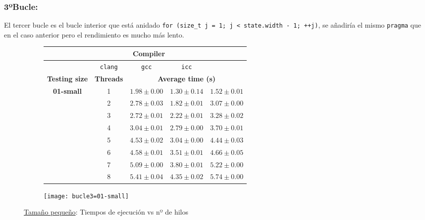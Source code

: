 
\subsubsection{\textbf{3ºBucle:}}

\par El tercer bucle es el bucle interior que está anidado \texttt{for (size\_t j = 1; j < state.width - 1; ++j)},
 se añadiría el mismo \texttt{pragma} que en el caso anterior pero el rendimiento es mucho más lento.

\begin{figure}[H]
    \centering
    \begin{subfigure}{0.4\textwidth}
        \begin{adjustbox}{width=\textwidth} 
        \begin{tabular}{|c|c|c|c|c|}
            \hline
            \rowcolor{azul} \multicolumn{2}{|c|}{}&\multicolumn{3}{c|}{\textbf{Compiler}} \\ \hline
            \rowcolor{azul} \multicolumn{2}{|c|}{}&\texttt{clang}&\texttt{gcc}&\texttt{icc}\\ \hline
            \rowcolor{azul} \textbf{Testing size} & \textbf{Threads}&\multicolumn{3}{c|}{\textbf{Average time (s)}} \\ \hline
            \multirow{8}{1cm}{\textbf{01-small}} & 1 & \(1.98\pm{0.00}\) & \(1.30\pm{0.14}\) & \(1.52\pm{0.01}\) \\ \cline{2-5}
            & 2 & \(2.78\pm{0.03}\) & \(1.82\pm{0.01}\) & \(3.07\pm{0.00}\) \\ \cline{2-5}
            & 3 & \(2.72\pm{0.01}\) & \(2.22\pm{0.01}\) & \(3.28\pm{0.02}\) \\ \cline{2-5}
            & 4 & \(3.04\pm{0.01}\) & \(2.79\pm{0.00}\) & \(3.70\pm{0.01}\) \\ \cline{2-5}
            & 5 & \(4.53\pm{0.02}\) & \(3.04\pm{0.00}\) & \(4.44\pm{0.03}\) \\ \cline{2-5}
            & 6 & \(4.58\pm{0.01}\) & \(3.51\pm{0.01}\) & \(4.66\pm{0.05}\) \\ \cline{2-5}
            & 7 & \(5.09\pm{0.00}\) & \(3.80\pm{0.01}\) & \(5.22\pm{0.00}\) \\ \cline{2-5}
            & 8 & \(5.41\pm{0.04}\) & \(4.35\pm{0.02}\) & \(5.74\pm{0.00}\) \\ \hline
        \end{tabular}
        \end{adjustbox}
    \end{subfigure}
    \hfill
    \begin{subfigure}{0.5\textwidth}
        \texttt{[image: bucle3=01-small]}
    \end{subfigure}
    \caption{\underline{Tamaño pequeño}: Tiempos de ejecución vs nº de hilos}
    \label{fig:bucle3=01-small}
\end{figure}

